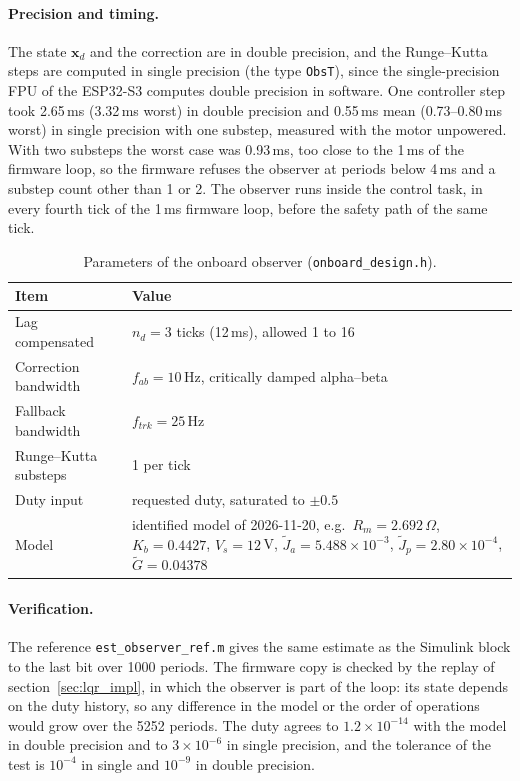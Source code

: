 \documentclass[a4paper,11pt]{article}
\begin{document}
\paragraph{Precision and timing.} The state $\mathbf{x}_d$ and the correction are in double precision, and the Runge--Kutta steps are computed in single precision (the type \texttt{ObsT}), since the single-precision FPU of the ESP32-S3 computes double precision in software. One controller step took 2.65\,ms (3.32\,ms worst) in double precision and 0.55\,ms mean (0.73--0.80\,ms worst) in single precision with one substep, measured with the motor unpowered. With two substeps the worst case was 0.93\,ms, too close to the 1\,ms of the firmware loop, so the firmware refuses the observer at periods below 4\,ms and a substep count other than 1 or 2. The observer runs inside the control task, in every fourth tick of the 1\,ms firmware loop, before the safety path of the same tick.

\begin{table}[h]
\centering
\caption{Parameters of the onboard observer (\texttt{onboard\_design.h}).}
\label{tab:obs_impl}
\small
\begin{tabular}{@{}lp{}@{}}
\toprule
Item & Value \\
\midrule
Lag compensated & $n_d = 3$ ticks (12\,ms), allowed 1 to 16 \\
Correction bandwidth & $f_{ab} = 10$\,Hz, critically damped alpha--beta \\
Fallback bandwidth & $f_{trk} = 25$\,Hz \\
Runge--Kutta substeps & 1 per tick \\
Duty input & requested duty, saturated to $\pm0.5$ \\
Model & identified model of 2026-11-20, e.g.\ $R_m = 2.692\,\Omega$, $K_b = 0.4427$, $V_s = 12$\,V, $\tilde J_a = 5.488\times10^{-3}$, $\tilde J_p = 2.80\times10^{-4}$, $\tilde G = 0.04378$ \\
\bottomrule
\end{tabular}
\end{table}

\paragraph{Verification.} The reference \texttt{est\_observer\_ref.m} gives the same estimate as the Simulink block to the last bit over 1000 periods. The firmware copy is checked by the replay of section~\ref{sec:lqr_impl}, in which the observer is part of the loop: its state depends on the duty history, so any difference in the model or the order of operations would grow over the 5252 periods. The duty agrees to $1.2\times10^{-14}$ with the model in double precision and to $3\times10^{-6}$ in single precision, and the tolerance of the test is $10^{-4}$ in single and $10^{-9}$ in double precision.
\end{document}
